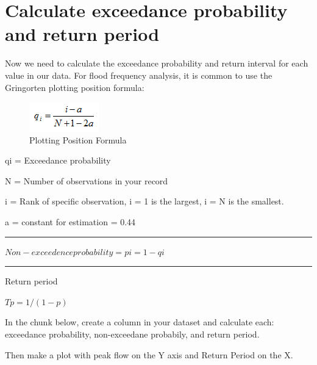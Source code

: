 \documentclass[
]{book}
\begin{document}
\hypertarget{calculate-exceedance-probability-and-return-period}{%
\section{Calculate exceedance probability and return period}\label{calculate-exceedance-probability-and-return-period}}

Now we need to calculate the exceedance probability and return interval for each value in our data. For flood frequency analysis, it is common to use the Gringorten plotting position formula:

\begin{figure}
\centering
\includegraphics{images/plottingposition.png}
\caption{Plotting Position Formula}
\end{figure}

qi = Exceedance probability

N = Number of observations in your record

i = Rank of specific observation, i = 1 is the largest, i = N is the smallest.

a = constant for estimation = 0.44

\begin{center}\rule{0.5\linewidth}{0.5pt}\end{center}

\(Non-exceedence probability = pi = 1 - qi\)

\begin{center}\rule{0.5\linewidth}{0.5pt}\end{center}

Return period

\(Tp = 1/(1-p)\)

In the chunk below, create a column in your dataset and calculate each: exceedance probability, non-exceedane probabily, and return period.

Then make a plot with peak flow on the Y axis and Return Period on the X.
\end{document}
